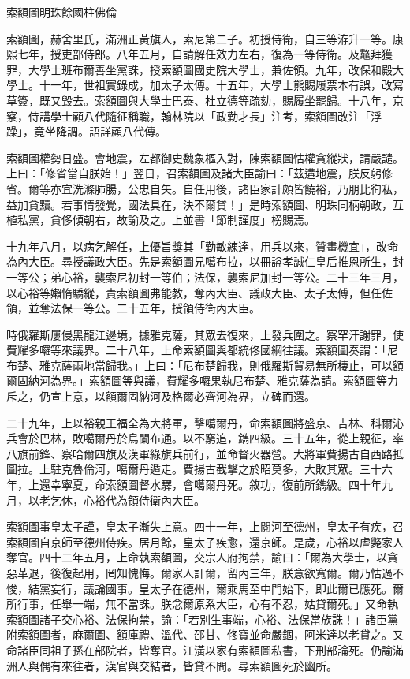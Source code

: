 
\begin{pinyinscope}
索額圖明珠餘國柱佛倫

索額圖，赫舍里氏，滿洲正黃旗人，索尼第二子。初授侍衛，自三等洊升一等。康熙七年，授吏部侍郎。八年五月，自請解任效力左右，復為一等侍衛。及鼇拜獲罪，大學士班布爾善坐黨誅，授索額圖國史院大學士，兼佐領。九年，改保和殿大學士。十一年，世祖實錄成，加太子太傅。十五年，大學士熊賜履票本有誤，改寫草簽，既又毀去。索額圖與大學士巴泰、杜立德等疏劾，賜履坐罷歸。十八年，京察，侍講學士顧八代隨征稱職，翰林院以「政勤才長」注考，索額圖改注「浮躁」，竟坐降調。語詳顧八代傳。

索額圖權勢日盛。會地震，左都御史魏象樞入對，陳索額圖怙權貪縱狀，請嚴譴。上曰：「修省當自朕始！」翌日，召索額圖及諸大臣諭曰：「茲遘地震，朕反躬修省。爾等亦宜洗滌肺腸，公忠自矢。自任用後，諸臣家計頗皆饒裕，乃朋比徇私，益加貪黷。若事情發覺，國法具在，決不爾貸！」是時索額圖、明珠同柄朝政，互植私黨，貪侈傾朝右，故諭及之。上並書「節制謹度」榜賜焉。

十九年八月，以病乞解任，上優旨獎其「勤敏練達，用兵以來，贊畫機宜」，改命為內大臣。尋授議政大臣。先是索額圖兄噶布拉，以冊謚孝誠仁皇后推恩所生，封一等公；弟心裕，襲索尼初封一等伯；法保，襲索尼加封一等公。二十三年三月，以心裕等嬾惰驕縱，責索額圖弗能教，奪內大臣、議政大臣、太子太傅，但任佐領，並奪法保一等公。二十五年，授領侍衛內大臣。

時俄羅斯屢侵黑龍江邊境，據雅克薩，其眾去復來，上發兵圍之。察罕汗謝罪，使費耀多囉等來議界。二十八年，上命索額圖與都統佟國綱往議。索額圖奏謂：「尼布楚、雅克薩兩地當歸我。」上曰：「尼布楚歸我，則俄羅斯貿易無所棲止，可以額爾固納河為界。」索額圖等與議，費耀多囉果執尼布楚、雅克薩為請。索額圖等力斥之，仍宣上意，以額爾固納河及格爾必齊河為界，立碑而還。

二十九年，上以裕親王福全為大將軍，擊噶爾丹，命索額圖將盛京、吉林、科爾沁兵會於巴林，敗噶爾丹於烏闌布通。以不窮追，鐫四級。三十五年，從上親征，率八旗前鋒、察哈爾四旗及漢軍綠旗兵前行，並命督火器營。大將軍費揚古自西路抵圖拉。上駐克魯倫河，噶爾丹遁走。費揚古截擊之於昭莫多，大敗其眾。三十六年，上還幸寧夏，命索額圖督水驛，會噶爾丹死。敘功，復前所鐫級。四十年九月，以老乞休，心裕代為領侍衛內大臣。

索額圖事皇太子謹，皇太子漸失上意。四十一年，上閱河至德州，皇太子有疾，召索額圖自京師至德州侍疾。居月餘，皇太子疾愈，還京師。是歲，心裕以虐斃家人奪官。四十二年五月，上命執索額圖，交宗人府拘禁，諭曰：「爾為大學士，以貪惡革退，後復起用，罔知愧悔。爾家人訐爾，留內三年，朕意欲寬爾。爾乃怙過不悛，結黨妄行，議論國事。皇太子在德州，爾乘馬至中門始下，即此爾已應死。爾所行事，任舉一端，無不當誅。朕念爾原系大臣，心有不忍，姑貸爾死。」又命執索額圖諸子交心裕、法保拘禁，諭：「若別生事端，心裕、法保當族誅！」諸臣黨附索額圖者，麻爾圖、額庫禮、溫代、邵甘、佟寶並命嚴錮，阿米達以老貸之。又命諸臣同祖子孫在部院者，皆奪官。江潢以家有索額圖私書，下刑部論死。仍諭滿洲人與偶有來往者，漢官與交結者，皆貸不問。尋索額圖死於幽所。


\end{pinyinscope}

